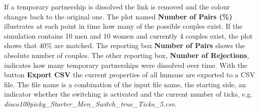 If a temporary partnership is dissolved the link is removed and the colour changes back to the original one.
The plot named \textbf{Number of Pairs (\%)} illustrates at each point in time how many of the possible couples exist. 
If the simulation contains 10 men and 10 women and currently 4 couples exist, the plot shows that 40\% are matched.
The reporting box \textbf{Number of Pairs} shows the absolute number of couples.
The other reporting box, \textbf{Number of Rejections}, indicates how many temporary partnerships were dissolved over time.
With the button \textbf{Export CSV} the current properties of all humans are exported to a CSV file.
The file name is a combination of the input file name, the starting side, an indicator whether the switching is activated and the current number of ticks,
e.g. \textit{disco100picky\_Starter\_Men\_Switch\_true\_Ticks\_5.csv}.

\clearpage
